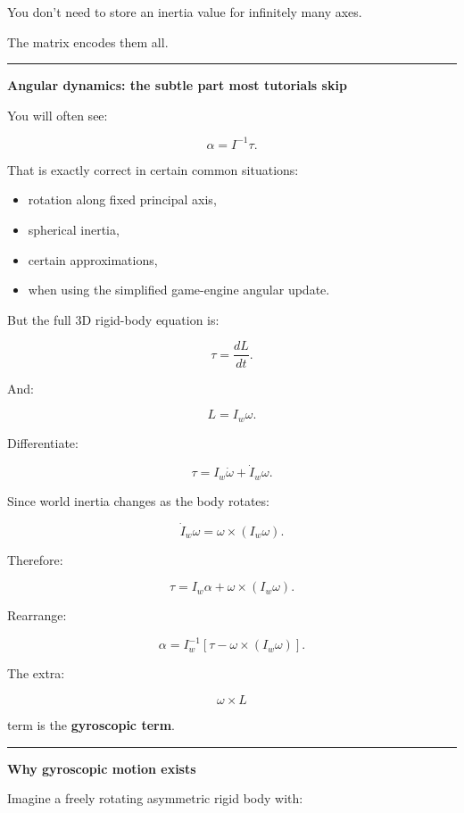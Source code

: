 You don't need to store an inertia value for infinitely many axes.

The matrix encodes them all.

\begin{center}\rule{0.5\linewidth}{0.5pt}\end{center}

\textbf{Angular dynamics: the subtle part most tutorials skip}

You will often see:

\[
\alpha
=
I^{-1}\tau.
\]

That is exactly correct in certain common situations:

\begin{itemize}
\tightlist
\item
  rotation along fixed principal axis,
\item
  spherical inertia,
\item
  certain approximations,
\item
  when using the simplified game-engine angular update.
\end{itemize}

But the full 3D rigid-body equation is:

\[
\boxed{
\tau
=
\frac{dL}{dt}.
}
\]

And:

\[
L=I_w\omega.
\]

Differentiate:

\[
\tau
=
I_w\dot\omega
+
\dot I_w\omega.
\]

Since world inertia changes as the body rotates:

\[
\dot I_w\omega
=
\omega\times(I_w\omega).
\]

Therefore:

\[
\boxed{
\tau
=
I_w\alpha
+
\omega\times(I_w\omega).
}
\]

Rearrange:

\[
\boxed{
\alpha
=
I_w^{-1}
\left[
\tau
-
\omega\times(I_w\omega)
\right].
}
\]

The extra:

\[
\omega\times L
\]

term is the \textbf{gyroscopic term}.

\begin{center}\rule{0.5\linewidth}{0.5pt}\end{center}

\textbf{Why gyroscopic motion exists}

Imagine a freely rotating asymmetric rigid body with:

